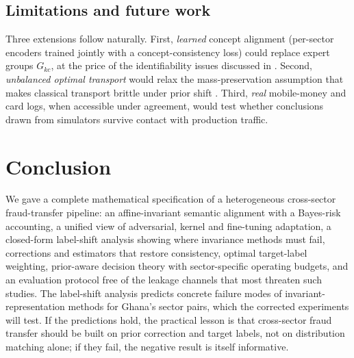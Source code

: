 \documentclass[journal]{IEEEtran}
\newcommand{\1}{\mathbf{1}}
\begin{document}
\subsection{Limitations and future work}
Three extensions follow naturally. First, \emph{learned} concept alignment (per-sector encoders trained jointly with a concept-consistency loss) could replace expert groups $G_{kc}$, at the price of the identifiability issues discussed in \cite{johansson2019support}. Second, \emph{unbalanced optimal transport} would relax the mass-preservation assumption that makes classical transport brittle under prior shift \cite{courty2017ot}. Third, \emph{real} mobile-money and card logs, when accessible under agreement, would test whether conclusions drawn from simulators \cite{lopezrojas2016paysim,azamuke2022momtsim} survive contact with production traffic.

\section{Conclusion}
We gave a complete mathematical specification of a heterogeneous cross-sector fraud-transfer pipeline: an affine-invariant semantic alignment with a Bayes-risk accounting, a unified view of adversarial, kernel and fine-tuning adaptation, a closed-form label-shift analysis showing where invariance methods must fail, corrections and estimators that restore consistency, optimal target-label weighting, prior-aware decision theory with sector-specific operating budgets, and an evaluation protocol free of the leakage channels that most threaten such studies. The label-shift analysis predicts concrete failure modes of invariant-representation methods for Ghana's sector pairs, which the corrected experiments will test. If the predictions hold, the practical lesson is that cross-sector fraud transfer should be built on prior correction and target labels, not on distribution matching alone; if they fail, the negative result is itself informative.


\appendices
\end{document}
